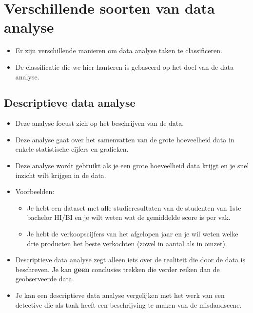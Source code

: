 \documentclass[]{memoir}
\providecommand{\tightlist}{%
  \setlength{\itemsep}{0pt}\setlength{\parskip}{0pt}}
\begin{document}
\hypertarget{verschillende-soorten-van-data-analyse}{%
\section{Verschillende soorten van data analyse}\label{verschillende-soorten-van-data-analyse}}

\begin{itemize}
\tightlist
\item
  Er zijn verschillende manieren om data analyse taken te classificeren.
\item
  De classificatie die we hier hanteren is gebaseerd op het doel van de data analyse.
\end{itemize}

\hypertarget{descriptieve-data-analyse}{%
\subsection*{Descriptieve data analyse}\label{descriptieve-data-analyse}}

\begin{itemize}
\tightlist
\item
  Deze analyse focust zich op het beschrijven van de data.
\item
  Deze analyse gaat over het samenvatten van de grote hoeveelheid data in enkele statistische cijfers en grafieken.
\item
  Deze analyse wordt gebruikt als je een grote hoeveelheid data krijgt en je snel inzicht wilt krijgen in de data.
\item
  Voorbeelden:

  \begin{itemize}
  \tightlist
  \item
    Je hebt een dataset met alle studieresultaten van de studenten van 1ste bachelor HI/BI en je wilt weten wat de gemiddelde score is per vak.
  \item
    Je hebt de verkoopscijfers van het afgelopen jaar en je wil weten welke drie producten het beste verkochten (zowel in aantal als in omzet).
  \end{itemize}
\item
  Descriptieve data analyse zegt alleen iets over de realiteit die door de data is beschreven. Je kan \textbf{geen} conclusies trekken die verder reiken dan de geobserveerde data.
\item
  Je kan een descriptieve data analyse vergelijken met het werk van een detective die als taak heeft een beschrijving te maken van de misdaadscene.
\end{itemize}
\end{document}
